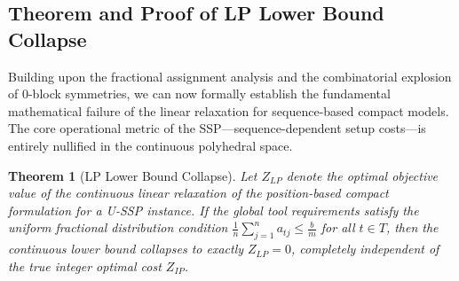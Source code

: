 \documentclass[11pt, a4paper]{book}
\newtheorem{theorem}{Theorem}[chapter]
\begin{document}
	\subsection{Theorem and Proof of LP Lower Bound Collapse}
	
	Building upon the fractional assignment analysis and the combinatorial explosion of 0-block symmetries, we can now formally establish the fundamental mathematical failure of the linear relaxation for sequence-based compact models. The core operational metric of the SSP---sequence-dependent setup costs---is entirely nullified in the continuous polyhedral space.
	
	\begin{theorem}[LP Lower Bound Collapse]
		Let $Z_{LP}$ denote the optimal objective value of the continuous linear relaxation of the position-based compact formulation for a U-SSP instance. If the global tool requirements satisfy the uniform fractional distribution condition $\frac{1}{n} \sum_{j=1}^{n} a_{tj} \le \frac{b}{m}$ for all $t \in T$, then the continuous lower bound collapses to exactly $Z_{LP} = 0$, completely independent of the true integer optimal cost $Z_{IP}$.
	\end{theorem}
	
\end{document}
